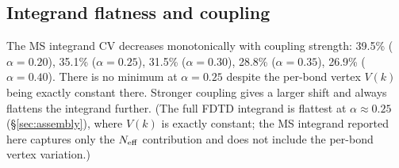 \documentclass[11pt]{article}
\begin{document}
\subsection{Integrand flatness and coupling}

The MS integrand CV decreases monotonically with coupling strength: 39.5\%
($\alpha = 0.20$), 35.1\% ($\alpha = 0.25$), 31.5\% ($\alpha = 0.30$), 28.8\%
($\alpha = 0.35$), 26.9\% ($\alpha = 0.40$). There is no minimum at
$\alpha = 0.25$ despite the per-bond vertex $V(k)$ being exactly constant
there. Stronger coupling gives a larger shift and always flattens the integrand
further. (The full FDTD integrand is flattest at $\alpha \approx 0.25$
(\S\ref{sec:assembly}), where $V(k)$ is exactly constant; the MS integrand
reported here captures only the $N_{\rm eff}$ contribution and does not
include the per-bond vertex variation.)
\end{document}
